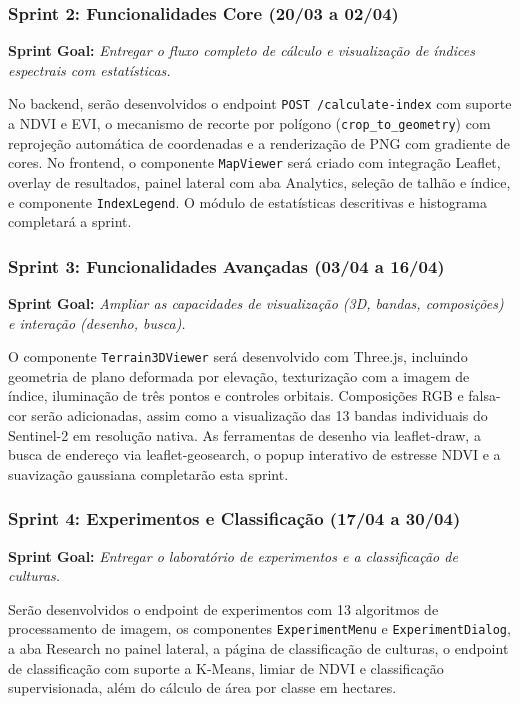 \documentclass[12pt, a4paper]{article}
\begin{document}
\subsubsection{Sprint 2: Funcionalidades Core (20/03 a 02/04)}

\textbf{Sprint Goal:} \textit{Entregar o fluxo completo de cálculo e visualização de índices espectrais com estatísticas.}

No backend, serão desenvolvidos o endpoint \texttt{POST /calculate-index} com suporte a NDVI e EVI, o mecanismo de recorte por polígono (\texttt{crop\_to\_geometry}) com reprojeção automática de coordenadas e a renderização de PNG com gradiente de cores. No frontend, o componente \texttt{MapViewer} será criado com integração Leaflet, overlay de resultados, painel lateral com aba Analytics, seleção de talhão e índice, e componente \texttt{IndexLegend}. O módulo de estatísticas descritivas e histograma completará a sprint.

\subsubsection{Sprint 3: Funcionalidades Avançadas (03/04 a 16/04)}

\textbf{Sprint Goal:} \textit{Ampliar as capacidades de visualização (3D, bandas, composições) e interação (desenho, busca).}

O componente \texttt{Terrain\-3DViewer} será desenvolvido com Three.js, incluindo geometria de plano deformada por elevação, texturização com a imagem de índice, iluminação de três pontos e controles orbitais. Composições RGB e falsa-cor serão adicionadas, assim como a visualização das 13 bandas individuais do Sentinel-2 em resolução nativa. As ferramentas de desenho via leaflet-draw, a busca de endereço via leaflet-geosearch, o popup interativo de estresse NDVI e a suavização gaussiana completarão esta sprint.

\subsubsection{Sprint 4: Experimentos e Classificação (17/04 a 30/04)}

\textbf{Sprint Goal:} \textit{Entregar o laboratório de experimentos e a classificação de culturas.}

Serão desenvolvidos o endpoint de experimentos com 13 algoritmos de processamento de imagem, os componentes \texttt{Experiment\-Menu} e \texttt{Experiment\-Dialog}, a aba Research no painel lateral, a página de classificação de culturas, o endpoint de classificação com suporte a K-Means, limiar de NDVI e classificação supervisionada, além do cálculo de área por classe em hectares.
\end{document}
